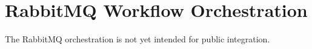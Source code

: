 \chapter{RabbitMQ Workflow Orchestration}\label{sec:rabbitmq}

The RabbitMQ orchestration is not yet intended for public integration.


